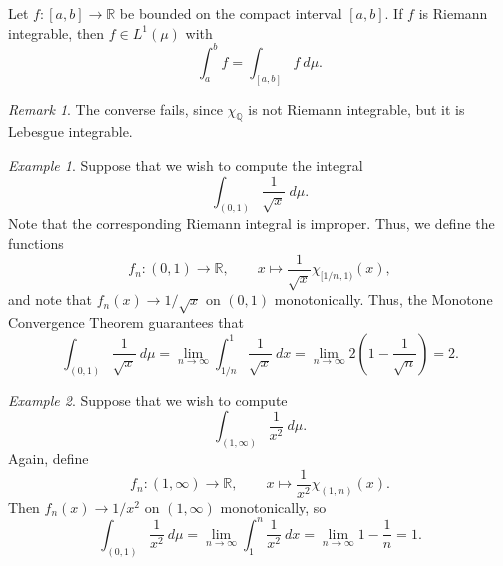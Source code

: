 \documentclass[11pt]{article}
\newcommand{\R}{\mathbb{R}}
\newcommand{\Q}{\mathbb{Q}}
\theoremstyle{definition}
\theoremstyle{remark}
\newtheorem*{remark}{Remark}
\newtheorem*{example}{Example}
\numberwithin{equation}{section}
\begin{document}
    \begin{theorem}
        Let $f\colon [a, b] \to \R$ be bounded on the compact interval $[a, b]$. If
        $f$ is Riemann integrable, then $f \in L^1(\mu)$ with \[
            \int_a^b f = \int_{[a, b]} f\:d\mu.
        \]
        \begin{remark}
            The converse fails, since $\chi_\Q$ is not Riemann integrable, but it is
            Lebesgue integrable.
        \end{remark}
    \end{theorem}
    \begin{example}
        Suppose that we wish to compute the integral \[
            \int_{(0, 1)} \frac{1}{\sqrt{x}}\:d\mu.
        \] Note that the corresponding Riemann integral is improper. Thus, we define
        the functions \[
            f_n\colon (0, 1) \to \R, \qquad
            x \mapsto \frac{1}{\sqrt{x}}\chi_{[1 / n, 1)}(x),
        \] and note that $f_n(x) \to 1 / \sqrt{x}$ on $(0, 1)$ monotonically.
        Thus, the Monotone Convergence Theorem guarantees that \[
            \int_{(0, 1)} \frac{1}{\sqrt{x}}\:d\mu = \lim_{n \to \infty} \int_{1 /
            n}^1 \frac{1}{\sqrt{x}}\:dx = \lim_{n \to \infty} 2 \left( 1 -
            \frac{1}{\sqrt{n}} \right) = 2.
        \]
    \end{example}
    \begin{example}
        Suppose that we wish to compute \[
            \int_{(1, \infty)} \frac{1}{x^2}\:d\mu.
        \] Again, define \[
            f_n\colon (1, \infty) \to \R, \qquad x \mapsto \frac{1}{x^2}\chi_{(1,
            n)}(x).
        \] Then $f_n(x) \to 1 / x^2$ on $(1, \infty)$ monotonically, so \[
            \int_{(0, 1)} \frac{1}{x^2}\:d\mu = \lim_{n \to \infty} \int_1^n
            \frac{1}{x^2}\:dx = \lim_{n \to \infty} 1 - \frac{1}{n} = 1.
        \]
    \end{example}
\end{document}
